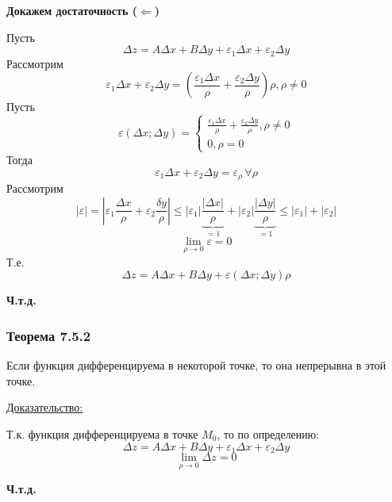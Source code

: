\documentclass[12pt]{article}
\begin{document}
\begin{adjustwidth}{1.5em}{1.5em}
        \textbf{Докажем достаточность ($\Leftarrow$)}\par\noindent
        Пусть 
        \[ \Delta z = A \Delta x + B \Delta y + \varepsilon_1 \Delta x + \varepsilon_2 \Delta y \]
        Рассмотрим 
        \[ \varepsilon_1 \Delta x + \varepsilon_2 \Delta y = \left( \frac{\varepsilon_1 \Delta x}{\rho} + \frac{\varepsilon_2 \Delta y}{\rho} \right) \rho, \rho \ne 0 \]
        Пусть
        \[ \varepsilon(\Delta x; \Delta y) = \begin{cases}
            \frac{\varepsilon_1 \Delta x}{\rho} + \frac{\varepsilon_2 \Delta y}{\rho}, \rho \ne 0\\
            0, \rho = 0
        \end{cases} \]
        Тогда
        \[ \varepsilon_1 \Delta x + \varepsilon_2 \Delta y = \varepsilon_\rho\, \forall \rho \]
        Рассмотрим
        \[ |\varepsilon| = \left| \varepsilon_1 \frac{\Delta x}{\rho} + \varepsilon_2 \frac{\delta y}{\rho} \right| \le |\varepsilon_1| \underbrace{\frac{|\Delta x|}{\rho}}_{= 1} + |\varepsilon_2| \underbrace{\frac{|\Delta y|}{\rho}}_{= 1} \le |\varepsilon_1| + |\varepsilon_2| \]
        \[ \lim_{\rho \to 0}\varepsilon = 0 \]
        Т.е.
        \[ \Delta z = A \Delta x + B \Delta y + \varepsilon (\Delta x; \Delta y)\rho \]
        \begin{center}
            \textbf{Ч.т.д.}
        \end{center}
    \end{adjustwidth}
    \subsubsection*{Теорема 7.5.2}\label{th:7.5.2}
    Если функция дифференцируема в некоторой точке, то она непрерывна в этой точке.\par\noindent
    \underline{Доказательство:}
    \begin{adjustwidth}{1.5em}{1.5em}
        Т.к. функция дифференцируема в точке $M_0$, то по определению:
        \[ \Delta z = A \Delta x + B \Delta y + \varepsilon_1 \Delta x + \varepsilon_2 \Delta y \]
        \[ \lim_{\rho \to 0} \Delta z = 0 \]
        \begin{center}
            \textbf{Ч.т.д.}
        \end{center}
    \end{adjustwidth}
\end{document}
